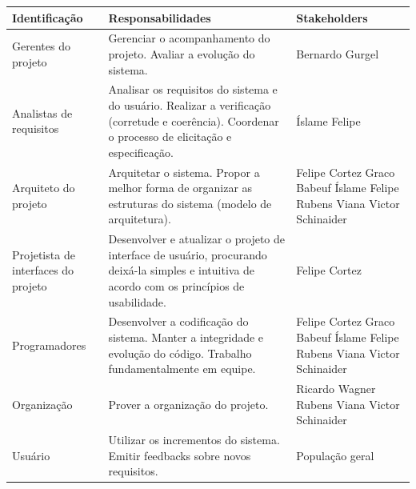 \documentclass[12pt, a4paper]{article}
\begin{document}
        \begin{longtabu}{X | X[2] | X[-1]}
                \hline
                \textbf{Identificação} &
                \textbf{Responsabilidades} &
                \textbf{Stakeholders}
                \\ \hline

                Gerentes do projeto &
                Gerenciar o acompanhamento do projeto. Avaliar a evolução do
                sistema. &
                Bernardo Gurgel
                \\ \hline

                Analistas de requisitos &
                Analisar os requisitos do sistema e do usuário. Realizar a
                verificação (corretude e coerência). Coordenar o processo de
                elicitação e especificação. &
                Íslame Felipe
                \\ \hline

                Arquiteto do projeto &
                Arquitetar o sistema. Propor a melhor forma de organizar as
                estruturas do sistema (modelo de arquitetura). &
                Felipe Cortez \newline
                Graco Babeuf \newline
                Íslame Felipe \newline
                Rubens Viana \newline
                Victor Schinaider
                \\ \hline

                Projetista de interfaces do projeto &
                Desenvolver e atualizar o projeto de interface de usuário,
                procurando deixá-la simples e intuitiva de acordo com os
                princípios de usabilidade. &
                Felipe Cortez
                \\ \hline

                Programadores &
                Desenvolver a codificação do sistema. Manter a integridade e
                evolução do código. Trabalho fundamentalmente em equipe. &
                Felipe Cortez \newline
                Graco Babeuf \newline
                Íslame Felipe \newline
                Rubens Viana \newline
                Victor Schinaider
                \\ \hline

                Organização &
                Prover a organização do projeto. &
                Ricardo Wagner \newline
                Rubens Viana \newline
                Victor Schinaider
                \\ \hline

                Usuário &
                Utilizar os incrementos do sistema. Emitir feedbacks sobre
                novos requisitos. &
                População geral
                \\ \hline
            \end{longtabu}
\end{document}

